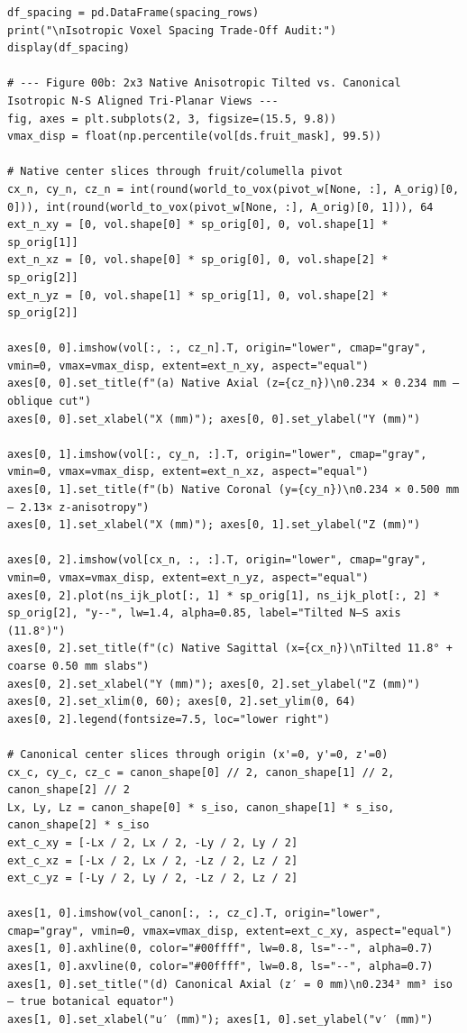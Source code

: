 \documentclass[10pt,a4paper]{article}
\renewcommand{\_}{\origunderscore\allowbreak}
\begin{document}
\begin{codebox}
\begin{lstlisting}[style=pybmed]
df_spacing = pd.DataFrame(spacing_rows)
print("\nIsotropic Voxel Spacing Trade-Off Audit:")
display(df_spacing)

# --- Figure 00b: 2x3 Native Anisotropic Tilted vs. Canonical Isotropic N-S Aligned Tri-Planar Views ---
fig, axes = plt.subplots(2, 3, figsize=(15.5, 9.8))
vmax_disp = float(np.percentile(vol[ds.fruit_mask], 99.5))

# Native center slices through fruit/columella pivot
cx_n, cy_n, cz_n = int(round(world_to_vox(pivot_w[None, :], A_orig)[0, 0])), int(round(world_to_vox(pivot_w[None, :], A_orig)[0, 1])), 64
ext_n_xy = [0, vol.shape[0] * sp_orig[0], 0, vol.shape[1] * sp_orig[1]]
ext_n_xz = [0, vol.shape[0] * sp_orig[0], 0, vol.shape[2] * sp_orig[2]]
ext_n_yz = [0, vol.shape[1] * sp_orig[1], 0, vol.shape[2] * sp_orig[2]]

axes[0, 0].imshow(vol[:, :, cz_n].T, origin="lower", cmap="gray", vmin=0, vmax=vmax_disp, extent=ext_n_xy, aspect="equal")
axes[0, 0].set_title(f"(a) Native Axial (z={cz_n})\n0.234 × 0.234 mm — oblique cut")
axes[0, 0].set_xlabel("X (mm)"); axes[0, 0].set_ylabel("Y (mm)")

axes[0, 1].imshow(vol[:, cy_n, :].T, origin="lower", cmap="gray", vmin=0, vmax=vmax_disp, extent=ext_n_xz, aspect="equal")
axes[0, 1].set_title(f"(b) Native Coronal (y={cy_n})\n0.234 × 0.500 mm — 2.13× z-anisotropy")
axes[0, 1].set_xlabel("X (mm)"); axes[0, 1].set_ylabel("Z (mm)")

axes[0, 2].imshow(vol[cx_n, :, :].T, origin="lower", cmap="gray", vmin=0, vmax=vmax_disp, extent=ext_n_yz, aspect="equal")
axes[0, 2].plot(ns_ijk_plot[:, 1] * sp_orig[1], ns_ijk_plot[:, 2] * sp_orig[2], "y--", lw=1.4, alpha=0.85, label="Tilted N–S axis (11.8°)")
axes[0, 2].set_title(f"(c) Native Sagittal (x={cx_n})\nTilted 11.8° + coarse 0.50 mm slabs")
axes[0, 2].set_xlabel("Y (mm)"); axes[0, 2].set_ylabel("Z (mm)")
axes[0, 2].set_xlim(0, 60); axes[0, 2].set_ylim(0, 64)
axes[0, 2].legend(fontsize=7.5, loc="lower right")

# Canonical center slices through origin (x'=0, y'=0, z'=0)
cx_c, cy_c, cz_c = canon_shape[0] // 2, canon_shape[1] // 2, canon_shape[2] // 2
Lx, Ly, Lz = canon_shape[0] * s_iso, canon_shape[1] * s_iso, canon_shape[2] * s_iso
ext_c_xy = [-Lx / 2, Lx / 2, -Ly / 2, Ly / 2]
ext_c_xz = [-Lx / 2, Lx / 2, -Lz / 2, Lz / 2]
ext_c_yz = [-Ly / 2, Ly / 2, -Lz / 2, Lz / 2]

axes[1, 0].imshow(vol_canon[:, :, cz_c].T, origin="lower", cmap="gray", vmin=0, vmax=vmax_disp, extent=ext_c_xy, aspect="equal")
axes[1, 0].axhline(0, color="#00ffff", lw=0.8, ls="--", alpha=0.7)
axes[1, 0].axvline(0, color="#00ffff", lw=0.8, ls="--", alpha=0.7)
axes[1, 0].set_title("(d) Canonical Axial (z′ = 0 mm)\n0.234³ mm³ iso — true botanical equator")
axes[1, 0].set_xlabel("u′ (mm)"); axes[1, 0].set_ylabel("v′ (mm)")


\end{lstlisting}
\end{codebox}
\end{document}
